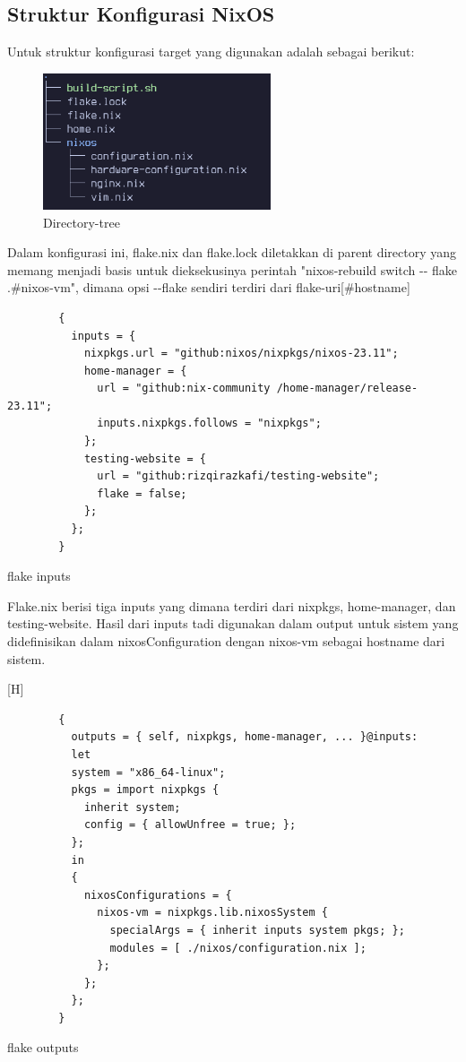 \documentclass[10pt,twoside]{report}
\newenvironment{code}{\captionsetup{type=listing}}{\vspace{3mm}}
\begin{document}
\begin{adjustwidth}{20pt}{}
	\subsection{Struktur Konfigurasi NixOS}
	\begin{adjustwidth}{20pt}{}
		\vspace{-3mm}
		Untuk struktur konfigurasi target yang digunakan adalah sebagai berikut:
		\begin{figure}[H]
			\centering
			\includegraphics[width=0.6\textwidth]{images/nix-tree.png}
			\caption{Directory-tree}
		\end{figure}

		Dalam konfigurasi ini, flake.nix dan flake.lock diletakkan di parent
		directory yang memang menjadi basis untuk dieksekusinya perintah
		"nixos-rebuild switch -{}- flake .\#nixos-vm", dimana opsi -{}-flake sendiri
		terdiri dari flake-uri[\#hostname]

		\begin{code}
			\begin{verbatim}
        {
          inputs = {
            nixpkgs.url = "github:nixos/nixpkgs/nixos-23.11";
            home-manager = {
              url = "github:nix-community /home-manager/release-23.11";
              inputs.nixpkgs.follows = "nixpkgs";
            };
            testing-website = {
              url = "github:rizqirazkafi/testing-website";
              flake = false;
            };
          };
        }
      \end{verbatim}
			\caption{flake inputs}
		\end{code}

		Flake.nix berisi tiga inputs yang dimana terdiri dari nixpkgs, home-manager,
		dan testing-website. Hasil dari inputs tadi digunakan dalam output untuk
		sistem yang didefinisikan dalam nixosConfiguration dengan nixos-vm sebagai
		hostname dari sistem.

		\begin{code}[H]
			\begin{verbatim}
        {
          outputs = { self, nixpkgs, home-manager, ... }@inputs:
          let
          system = "x86_64-linux";
          pkgs = import nixpkgs {
            inherit system;
            config = { allowUnfree = true; };
          };
          in
          {
            nixosConfigurations = {
              nixos-vm = nixpkgs.lib.nixosSystem {
                specialArgs = { inherit inputs system pkgs; };
                modules = [ ./nixos/configuration.nix ];
              };
            };
          };
        }
      \end{verbatim}
			\caption{flake outputs}
		\end{code}


\end{adjustwidth}
\end{adjustwidth}
\end{document}
